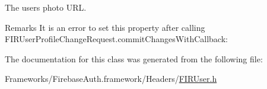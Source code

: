 The user\textquotesingle{}s photo U\+R\+L. 

\begin{DoxyRemark}{Remarks}
It is an error to set this property after calling {\ttfamily F\+I\+R\+User\+Profile\+Change\+Request.\+commit\+Changes\+With\+Callback\+:} 
\end{DoxyRemark}


The documentation for this class was generated from the following file\+:\begin{DoxyCompactItemize}
\item 
Frameworks/\+Firebase\+Auth.\+framework/\+Headers/\hyperlink{_f_i_r_user_8h}{F\+I\+R\+User.\+h}\end{DoxyCompactItemize}
